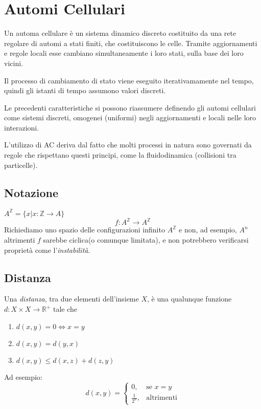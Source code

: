 \section{Automi Cellulari}
Un automa cellulare è un sistema dinamico discreto costituito da una rete regolare di automi a stati finiti, che costituiscono le celle. Tramite aggiornamenti e regole locali esse cambiano simultaneamente i loro stati, sulla base dei loro vicini.

Il processo di cambiamento di stato viene eseguito iterativamamente nel tempo, quindi gli istanti di tempo assumono valori discreti.

Le precedenti caratteristiche si possono riassumere definendo gli automi cellulari come sistemi discreti, omogenei (uniformi) negli aggiornamenti e locali nelle loro interazioni.

L'utilizzo di AC deriva dal fatto che molti processi in natura sono governati da regole che rispettano questi principi, come la fluidodinamica (collisioni tra particelle). 





	
\subsection{Notazione} 
$A^\mathds{Z} = \{ x | x: \mathds{Z} \rightarrow A\}$
$$ f: A^\mathds{Z} \rightarrow A^\mathds{Z} $$
Richiediamo uno spazio delle configurazioni infinito $A^\mathds{Z}$ e non, ad esempio, $A^n$ altrimenti $f$ sarebbe ciclica(o comunque limitata), e non potrebbero verificarsi proprietà come l'\textit{instabilità}.

\subsection{Distanza}
Una \textit{distanza}, tra due elementi dell'insieme $X$, è una qualunque funzione $d: X \times X \rightarrow \mathds{R}^{+}$ tale che
	
\begin{enumerate}
	\item $d(x,y) = 0 \Leftrightarrow x = y$
	\item $d(x,y) = d(y,x) $
	\item $d(x,y) \leq d(x,z) + d(z,y)$
\end{enumerate}
	
Ad esempio:
\begin{equation}    
	d(x,y)= 
	\begin{cases}
	0,& \text{se } x=y\\
	\frac{1}{2^n},              & \text{altrimenti}
	\end{cases}
\end{equation}
	
